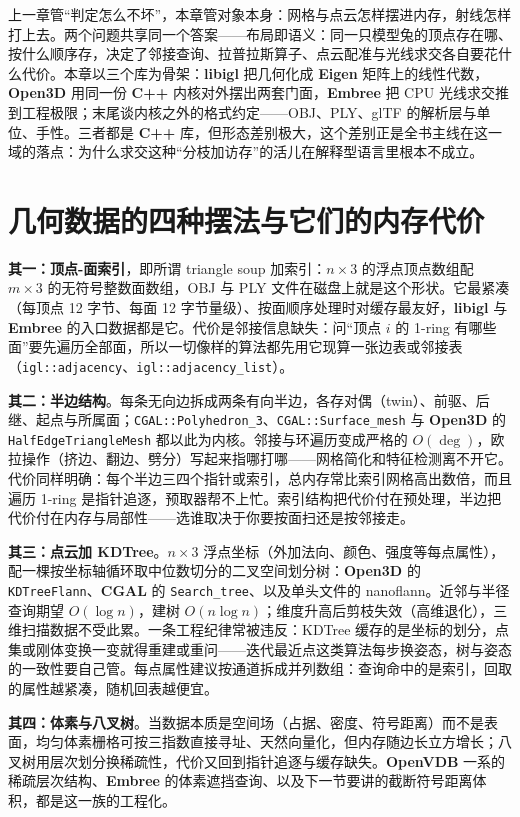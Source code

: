 \documentclass[12pt,a4paper,fontset=fandol]{ctexbook}
\newcommand{\Tp}[1]{\texttt{#1}}
\newcommand{\Lib}[1]{\textbf{#1}}
\newcommand{\Lang}[1]{\textsf{\bfseries #1}}
\newcommand{\CPP}{\Lang{C++}}
\begin{document}
上一章管``判定怎么不坏''，本章管对象本身：网格与点云怎样摆进内存，射线怎样打上去。两个问题共享同一个答案——布局即语义：同一只模型兔的顶点存在哪、按什么顺序存，决定了邻接查询、拉普拉斯算子、点云配准与光线求交各自要花什么代价。本章以三个库为骨架：\Lib{libigl} 把几何化成 \Lib{Eigen} 矩阵上的线性代数，\Lib{Open3D} 用同一份 \CPP{} 内核对外摆出两套门面，\Lib{Embree} 把 CPU 光线求交推到工程极限；末尾谈内核之外的格式约定——OBJ、PLY、glTF 的解析层与单位、手性。三者都是 \CPP{} 库，但形态差别极大，这个差别正是全书主线在这一域的落点：为什么求交这种``分枝加访存''的活儿在解释型语言里根本不成立。

\section{几何数据的四种摆法与它们的内存代价}

\textbf{其一：顶点-面索引}，即所谓 triangle soup 加索引：$n\times3$ 的浮点顶点数组配 $m\times3$ 的无符号整数面数组，OBJ 与 PLY 文件在磁盘上就是这个形状。它最紧凑（每顶点 12 字节、每面 12 字节量级）、按面顺序处理时对缓存最友好，\Lib{libigl} 与 \Lib{Embree} 的入口数据都是它。代价是邻接信息缺失：问``顶点 $i$ 的 1-ring 有哪些面''要先遍历全部面，所以一切像样的算法都先用它现算一张边表或邻接表（\Tp{igl::adjacency}、\Tp{igl::adjacency\_list}）。

\textbf{其二：半边结构}。每条无向边拆成两条有向半边，各存对偶（twin）、前驱、后继、起点与所属面；\Tp{CGAL::Polyhedron\_3}、\Tp{CGAL::Surface\_mesh} 与 \Lib{Open3D} 的 \Tp{HalfEdgeTriangleMesh} 都以此为内核。邻接与环遍历变成严格的 $O(\deg)$，欧拉操作（挤边、翻边、劈分）写起来指哪打哪——网格简化和特征检测离不开它。代价同样明确：每个半边三四个指针或索引，总内存常比索引网格高出数倍，而且遍历 1-ring 是指针追逐，预取器帮不上忙。索引结构把代价付在预处理，半边把代价付在内存与局部性——选谁取决于你要按面扫还是按邻接走。

\textbf{其三：点云加 KDTree}。$n\times3$ 浮点坐标（外加法向、颜色、强度等每点属性），配一棵按坐标轴循环取中位数切分的二叉空间划分树：\Lib{Open3D} 的 \Tp{KDTreeFlann}、\Lib{CGAL} 的 \Tp{Search\_tree}、以及单头文件的 nanoflann。近邻与半径查询期望 $O(\log n)$，建树 $O(n\log n)$；维度升高后剪枝失效（高维退化），三维扫描数据不受此累。一条工程纪律常被违反：KDTree 缓存的是坐标的划分，点集或刚体变换一变就得重建或重问——迭代最近点这类算法每步换姿态，树与姿态的一致性要自己管。每点属性建议按通道拆成并列数组：查询命中的是索引，回取的属性越紧凑，随机回表越便宜。

\textbf{其四：体素与八叉树}。当数据本质是空间场（占据、密度、符号距离）而不是表面，均匀体素栅格可按三指数直接寻址、天然向量化，但内存随边长立方增长；八叉树用层次划分换稀疏性，代价又回到指针追逐与缓存缺失。\Lib{OpenVDB} 一系的稀疏层次结构、\Lib{Embree} 的体素遮挡查询、以及下一节要讲的截断符号距离体积，都是这一族的工程化。
\end{document}
